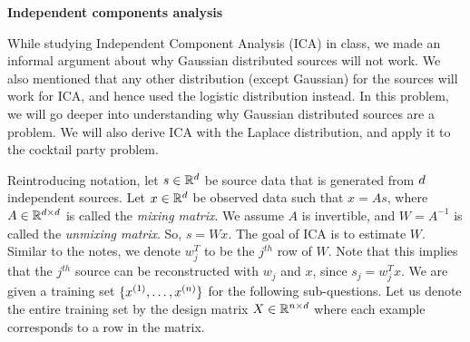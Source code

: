 \item {} {\bf Independent components analysis}


While studying Independent Component Analysis (ICA) in class, we made an informal argument about why Gaussian distributed sources will not work. We also mentioned that any other distribution (except Gaussian) for the sources will work for ICA, and hence used the logistic distribution instead. In this problem, we will go deeper into understanding why Gaussian distributed sources are a problem. We will also derive ICA with the Laplace distribution, and apply it to the cocktail party problem.

Reintroducing notation, let $s \in \mathbb{R}^{d}$ be source data that is generated from ${d}$ independent sources. Let $x \in \mathbb{R}^{d}$ be observed data such that $x = As$, where $A\in\mathbb{R}^{{d} \times {d}}$ is called the \emph{mixing matrix}. We assume $A$ is invertible, and $W = A^{-1}$ is called the \emph{unmixing matrix}. So, $s = Wx$. The goal of ICA is to estimate $W$. Similar to the notes, we denote $w_j^T$ to be the $j^{th}$ row of $W$. Note that this implies that the $j^{th}$ source can be reconstructed with $w_j$ and $x$, since $s_j = w_j^T x$. We are given a training set $\{x^{(1)},\ldots,x^{({n})}\}$ for the following sub-questions. Let us denote the entire training set by the design matrix $X \in \mathbb{R}^{{n} \times {d}}$ where each example corresponds to a row in the matrix.

\begin{enumerate}
    

\ifnum{} {
  
} \fi

    
\ifnum{} {
  
} \fi


    
\ifnum{} {
  
} \fi
\end{enumerate}
